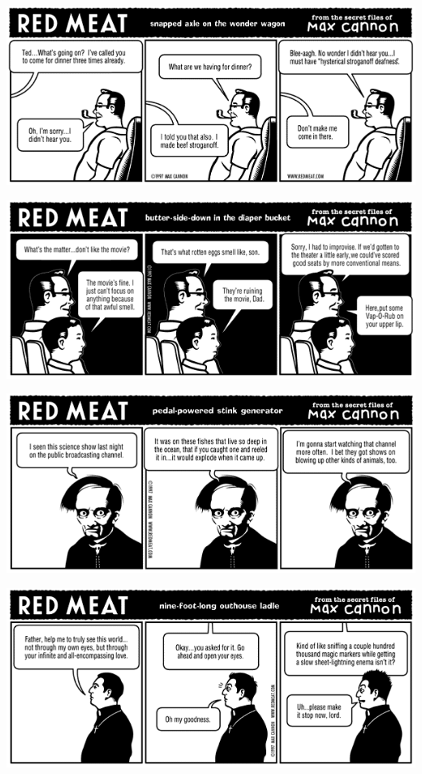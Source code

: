 \documentclass[a4paper,twoside,11pt]{article}
\begin{document}
\includegraphics[width=\textwidth]{redmeat_1997-09-01.png}



\includegraphics[width=\textwidth]{redmeat_1997-09-08.png}



\includegraphics[width=\textwidth]{redmeat_1997-09-15.png}



\includegraphics[width=\textwidth]{redmeat_1997-09-22.png}
\end{document}
